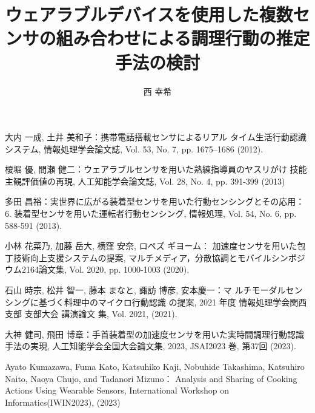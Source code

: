 \documentclass[a4j,8pt,twocolumn]{extarticle}
\title{ウェアラブルデバイスを使用した複数センサの組み合わせによる調理行動の推定手法の検討}
\author{西 幸希}
\affiliation{愛知工業大学情報学部}
\begin{document}
	
\maketitle
\thispagestyle{empty}	%





\begin{thebibliography}{9}
大内 一成, 土井 美和子：携帯電話搭載センサによるリアル
タイム生活行動認識システム, 情報処理学会論文誌, Vol. 53,
No. 7, pp. 1675–1686 (2012).

榎堀 優, 間瀬 健二：ウェアラブルセンサを用いた熟練指導員のヤスリがけ
技能主観評価値の再現, 人工知能学会論文誌, Vol. 28, No. 4, pp. 391-399 (2013)

多田 昌裕：実世界に広がる装着型センサを用いた行動センシングとその応用：6. 装着型センサを用いた運転者行動センシング, 情報処理, Vol. 54, No. 6, pp. 588-591 (2013).

小林 花菜乃, 加藤 岳大, 横窪 安奈, ロペズ ギヨーム：
加速度センサを用いた包丁技術向上支援システムの提案, マルチメディア，分散協調とモバイルシンポジウム2164論文集, Vol. 2020, pp. 1000-1003 (2020).

石山 時宗, 松井 智一, 藤本 まなと, 諏訪 博彦, 安本慶一：マ
ルチモーダルセンシングに基づく料理中のマイクロ行動認識
の提案, 2021 年度 情報処理学会関西支部 支部大会 講演論文
集, Vol. 2021, (2021).

大神 健司, 飛田 博章：手首装着型の加速度センサを用いた実時間調理行動認識手法の実現,
 人工知能学会全国大会論文集, 2023, JSAI2023 巻, 第37回 (2023).

Ayato Kumazawa, Fuma Kato, Katsuhiko Kaji, Nobuhide Takashima, Katsuhiro Naito, Naoya Chujo, and Tadanori Mizuno：
Analysis and Sharing of Cooking Actions Using Wearable Sensors, International Workshop on Informatics(IWIN2023), (2023)
 

\end{thebibliography}


\end{document}
